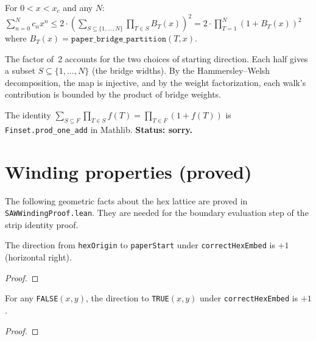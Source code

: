 \begin{theorem}\label{thm:hw_injection}
  For $0 < x < x_c$ and any $N$:
  $\sum_{n=0}^{N} c_n x^n \leq
    2 \cdot \left(\sum_{S \subseteq \{1,\ldots,N\}}
    \prod_{T \in S} B_T(x)\right)^2
    = 2 \cdot \prod_{T=1}^{N} (1 + B_T(x))^2$
  where $B_T(x) = \texttt{paper\_bridge\_partition}(T, x)$.

  The factor of~2 accounts for the two choices of starting direction.
  Each half gives a subset $S \subseteq \{1,\ldots,N\}$ (the bridge widths).
  By the Hammersley--Welsh decomposition, the map is injective, and by
  the weight factorization, each walk's contribution is bounded by the
  product of bridge weights.

  The identity $\sum_{S \subseteq F} \prod_{T \in S} f(T) = \prod_{T \in F} (1 + f(T))$
  is \texttt{Finset.prod\_one\_add} in Mathlib.
  \textbf{Status: sorry.}
\end{theorem}

\section{Winding properties (proved)}\label{sec:winding_props}

The following geometric facts about the hex lattice are proved in
\texttt{SAWWindingProof.lean}. They are needed for the boundary
evaluation step of the strip identity proof.

\begin{lemma}\label{lem:starting_dir}
\leanok
{}
  The direction from \texttt{hexOrigin} to \texttt{paperStart} under
  \texttt{correctHexEmbed} is $+1$ (horizontal right).
\end{lemma}
\begin{proof}
\leanok
\end{proof}

\begin{lemma}\label{lem:right_bdy_dir}
\leanok
{}
  For any \texttt{FALSE}$(x,y)$, the direction to \texttt{TRUE}$(x,y)$
  under \texttt{correctHexEmbed} is $+1$.
\end{lemma}
\begin{proof}
\leanok
\end{proof}

